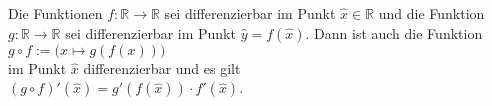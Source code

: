 \begin{Satz} 
  Die Funktionen $f:\mathbb{R} \rightarrow \mathbb{R}$ 
  sei differenzierbar im Punkt $\widehat{x}\in\mathbb{R}$ und die Funktion
  $g:\mathbb{R} \rightarrow \mathbb{R}$ sei differenzierbar im Punkt 
  $\widehat{y} = f(\widehat{x})$.  Dann ist auch die Funktion
  \\[0.2cm]
  \hspace*{1.3cm}
  $g \circ f := \bigr(x \mapsto g(f(x))\bigr)$ 
  \\[0.2cm]
  im Punkt $\widehat{x}$  differenzierbar und es gilt 
  \\[0.3cm]
  \hspace*{1.3cm}
  $(g\circ f)'(\widehat{x}) = g'(f(\widehat{x})) \cdot f'(\widehat{x})$.  
\end{Satz}

